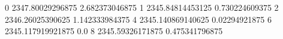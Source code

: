 0 2347.80029296875 2.682373046875
1 2345.84814453125 0.730224609375
2 2346.26025390625 1.142333984375
4 2345.140869140625 0.02294921875
6 2345.117919921875 0.0
8 2345.59326171875 0.475341796875
